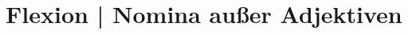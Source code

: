 \documentclass[handout,aspectratio=1610,dvipsnames]{beamer}
\begin{document}
  \section{Flexion | Nomina außer Adjektiven}
  \let\woopsi\section\let\section\subsection\let\subsection\subsubsection
  
  \let\subsection\section\let\section\woopsi
  
\end{document}
